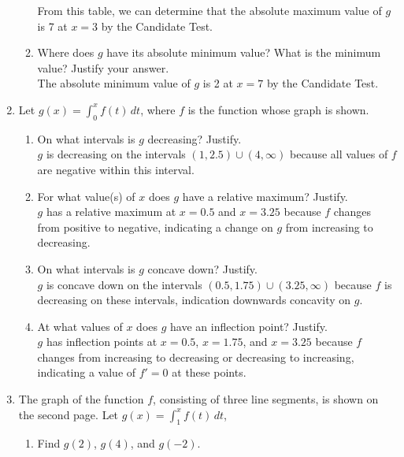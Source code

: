 \documentclass[10pt, letterpaper]{report}
\begin{document}
\begin{enumerate}
\begin{enumerate}
      From this table, we can determine that the absolute maximum value of $g$ is 7 at $x=3$ by the Candidate Test.

    \item{Where does $g$ have its absolute minimum value? What is the minimum value? Justify your answer. } \\

      The absolute minimum value of $g$ is 2 at $x=7$ by the Candidate Test.

  \end{enumerate}
  \pagebreak
  \item{Let $g(x)=\int_{0}^{x}{f(t)}\,dt$, where $f$ is the function whose graph is shown.}
  \begin{enumerate}
    \item{On what intervals is $g$ decreasing? Justify.} \\

      $g$ is decreasing on the intervals $(1,2.5)\cup(4,\infty)$ because all values of $f$ are negative within this interval. \\

    \item{For what value(s) of $x$ does $g$ have a relative maximum? Justify.} \\

      $g$ has a relative maximum at $x=0.5$ and $x=3.25$ because $f$ changes from positive to negative, indicating a change on $g$ from increasing to decreasing. \\

    \item{On what intervals is $g$ concave down? Justify.} \\

      $g$ is concave down on the intervals $(0.5,1.75)\cup(3.25,\infty)$ because $f$ is decreasing on these intervals, indication downwards concavity on $g$. \\

    \item{At what values of $x$ does $g$ have an inflection point? Justify.} \\

      $g$ has inflection points at $x=0.5$, $x=1.75$, and $x=3.25$ because $f$ changes from increasing to decreasing or decreasing to increasing, indicating a value of $f' = 0$ at these points. \\

  \end{enumerate}
  \pagebreak
  \item{The graph of the function $f$, consisting of three line segments, is shown on the second page. Let $g(x)=\int_{1}^{x}{f(t)}\,dt$,}
  \begin{enumerate}
    \item{Find $g(2)$, $g(4)$, and $g(-2)$.} \\


\end{enumerate}
\end{enumerate}
\end{document}
